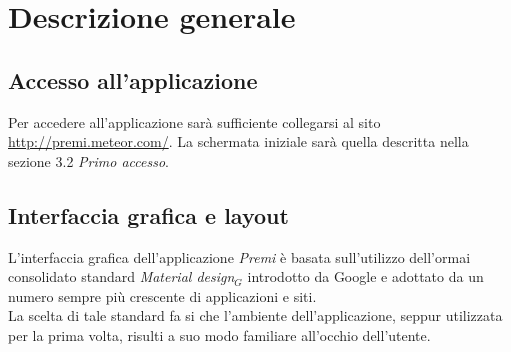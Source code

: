 \section{Descrizione generale}

\subsection{Accesso all'applicazione}
Per accedere all'applicazione sarà sufficiente collegarsi al sito \href{http://premi.meteor.com/}{http://premi.meteor.com/}. La schermata iniziale sarà quella descritta nella sezione 3.2 \emph{Primo accesso}.

\subsection{Interfaccia grafica e layout}
L'interfaccia grafica dell'applicazione \emph{Premi} è basata sull'utilizzo dell'ormai consolidato standard \emph{Material design}$_G$ introdotto da Google e adottato da un numero sempre più crescente di applicazioni e siti. \\
La scelta di tale standard fa si che l'ambiente dell'applicazione, seppur utilizzata per la prima volta, risulti a suo modo familiare all'occhio dell'utente.
